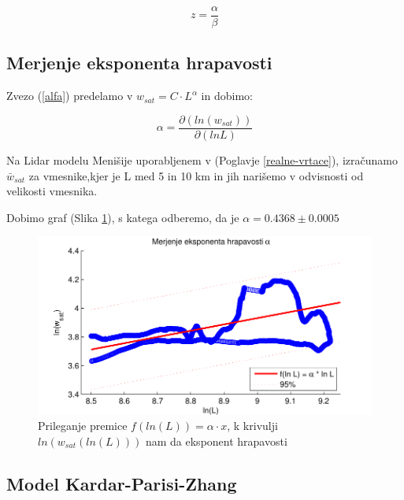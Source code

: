 \documentclass[a4paper, oneside, 12pt]{book}
\begin{document}
            \begin{equation}
              z = \frac{\alpha}{\beta}
            \end{equation}


            \subsection{Merjenje eksponenta hrapavosti}
            \label{hrapavost}

            Zvezo (\ref{alfa}) predelamo  v $ w_{sat}=C \cdot L^\alpha $ in dobimo:

            \begin{equation}
              \alpha = \frac{\partial ( ln (w_{sat}) ) }{\partial ( ln L )}
              \label{alpha-numeric}
            \end{equation}

            Na Lidar modelu Menišije uporabljenem v (Poglavje \ref{realne-vrtace}), izračunamo $\bar{w}_{sat}$ za vmesnike,kjer je L med 5 in 10 km in jih narišemo v odvisnosti od velikosti vmesnika.

            Dobimo graf (Slika \ref{fig:menisija-alfa}), s katega odberemo, da je $\alpha =  0.4368 \pm 0.0005$

            \begin{figure}[H]
              \begin{center}
                \includegraphics{slike/menisija-alfa.pdf}
              \end{center}
              \caption{Prileganje premice $f(ln(L)) = \alpha \cdot x$, k krivulji $ln(w_{sat}(ln(L)))$ nam da eksponent hrapavosti}
              \label{fig:menisija-alfa}
            \end{figure}


            \subsection{Model Kardar-Parisi-Zhang}
\end{document}
